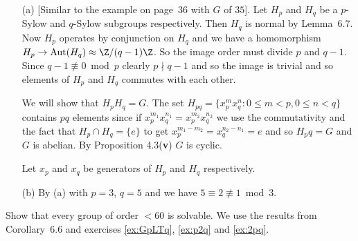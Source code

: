 \documentclass[12pt]{book}
\newcommand{\Zm}[1]{\Z/#1\Z} %
\newcommand{\eG}{\ensuremath{\{e\}}}
\def\Aut{\mathop{\rm Aut}\nolimits}
\newcounter{myenumi}
\newenvironment{myenumerate}
{\begin{enumerate}
 \setcounter{enumi}{\themyenumi}
}
{\setcounter{myenumi}{\theenumi}
 \end{enumerate}}
\begin{document}
\begin{myenumerate}
\begin{itemize}
 \item[(a)]
   [Similar to the example on page~36 with $G$ of \(35\)].
   Let \(H_p\) and \(H_q\) be a $p$-Sylow and $q$-Sylow subgroups respectively.
   Then \(H_q\) is normal by Lemma~6.7.
   Now \(H_p\) operates by conjunction on \(H_q\) and we have
   a homomorphism \(H_p\rightarrow \Aut(H_q) \approx \Zm{(q-1)}\).
   So the image order must divide $p$ and \(q-1\).
   Since \(q-1\not\equiv 0 \bmod p\) clearly \(p\nmid q-1\)
   and so the image is trivial and so elements of \(H_p\) and \(H_q\)
   commutes with each other.

   We will show that \(H_pH_q = G\).
   The set \(H_{pq}=\{x_p^m x_q^n: 0\leq m<p, 0\leq n<q\}\)
   contains \(pq\) elements
   since if \(x_p^{m_1} x_q^{n_1} = x_p^{m_2} x_q^{n_2}\)
   we use the commutativity and the fact that \(H_p\cap H_q=\eG\)
   to get \(x_p^{m_1-m_2} = x_q^{n_2-n_1} = e\) and so \(H_pq=G\)
   and $G$ is abelian. By Proposition 4.3(\textbf{v}) $G$ is cyclic.

   Let \(x_p\) and \(x_q\) be generators of \(H_p\) and \(H_q\) respectively.
 \item[(b)] By (a) with \(p=3\), \(q=5\) and we have
      \(5\equiv 2\not\equiv 1 \bmod 3\).

\end{itemize}

\begin{excopy}
Show that every group of order \(<60\) is solvable.
We use the results from Corollary~6.6 and
exercises \ref{ex:GpLTq}, \ref{ex:p2q} and \ref{ex:2pq}.
\end{excopy}

{

}
\end{myenumerate}
\end{document}
